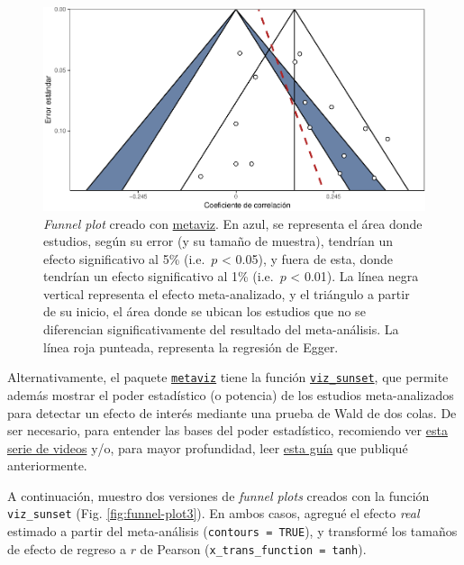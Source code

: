 \documentclass[
  bookmarksnumbered]{article}
\begin{document}
\begin{figure}
\centering
\includegraphics{Meta-analysis_files/figure-latex/funnel-plot2-1.pdf}
\caption{\label{fig:funnel-plot2}\emph{Funnel plot} creado con \href{https://cran.r-project.org/web/packages/metaviz/vignettes/metaviz.html}{metaviz}. En azul, se representa el área donde estudios, según su error (y su tamaño de muestra), tendrían un efecto significativo al 5\% (i.e.~\(p\) \textless{} 0.05), y fuera de esta, donde tendrían un efecto significativo al 1\% (i.e.~\(p\) \textless{} 0.01). La línea negra vertical representa el efecto meta-analizado, y el triángulo a partir de su inicio, el área donde se ubican los estudios que no se diferencian significativamente del resultado del meta-análisis. La línea roja punteada, representa la regresión de Egger.}
\end{figure}

Alternativamente, el paquete \href{https://cran.r-project.org/web/packages/metaviz/vignettes/metaviz.html}{\texttt{metaviz}} tiene la función \href{https://cran.r-project.org/web/packages/metaviz/vignettes/metaviz.html\#sunset-power-enhanced-funnel-plots}{\texttt{viz\_sunset}}, que permite además mostrar el poder estadístico (o potencia) de los estudios meta-analizados para detectar un efecto de interés mediante una prueba de Wald de dos colas. De ser necesario, para entender las bases del poder estadístico, recomiendo ver \href{https://youtube.com/playlist?list\%20=\%20PLHk7UNt35ccVdyHqnQ6oXVYA6JBNFrE1x}{esta serie de videos} \autocite{leongomezPoderRvid2020} y/o, para mayor profundidad, leer \href{https://doi.org/10.5281/zenodo.3988776}{esta guía} \autocite{leongomezAnalisisPoderEstadistico2020} que publiqué anteriormente.

A continuación, muestro dos versiones de \emph{funnel plots} creados con la función \texttt{viz\_sunset} (Fig. \ref{fig:funnel-plot3}). En ambos casos, agregué el efecto \emph{real} estimado a partir del meta-análisis (\texttt{contours\ =\ TRUE}), y transformé los tamaños de efecto de regreso a \(r\) de Pearson (\texttt{x\_trans\_function\ =\ tanh}).
\end{document}

